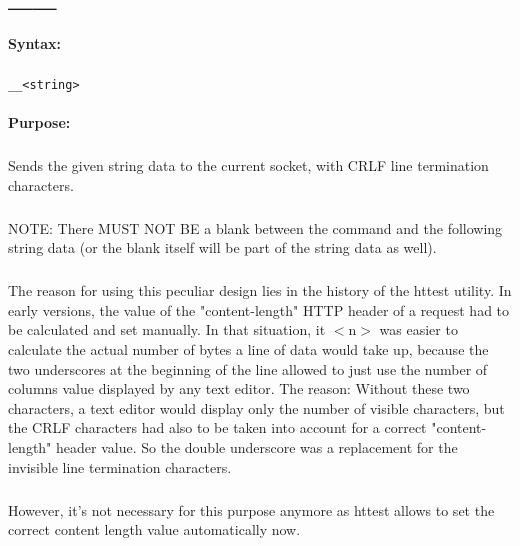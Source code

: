 
\newpage
\section{\_\_}
\label{cmd:__}

\paragraph{Syntax:}
\subparagraph{}
\texttt{\_\_<string>}

\paragraph{Purpose:}
\subparagraph{}
Sends the given string data to the current socket, with  
CRLF line termination characters.

\subparagraph{}
NOTE: There MUST NOT BE a blank between the command and the 
following string data (or the blank itself will be part of the 
string data as well).

\subparagraph{}
The reason for using this peculiar design lies in the history 
of the httest utility. In early versions, the value of the "content-length" 
HTTP header of a request had to be calculated and set manually. In that 
situation, it $<$n$>$ was easier to calculate the actual number of bytes 
a line of data would take up, because the two underscores at the 
beginning of the line allowed to just use the number of columns 
value displayed by any text editor. The reason: Without 
these two characters, a text editor would display only the number 
of visible characters, but the CRLF characters had also to be taken 
into account for a correct "content-length" header value. So the 
double underscore was a replacement for the invisible line termination 
characters.

\subparagraph{}
However, it's not necessary for this purpose anymore as httest 
allows to set the correct content length value automatically now.